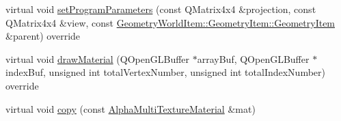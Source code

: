 \begin{DoxyCompactItemize}
virtual void \mbox{\hyperlink{class_geometry_engine_1_1_geometry_material_1_1_alpha_multi_texture_material_ad230fe9a3f174933644c40ed10ba15a7}{set\+Program\+Parameters}} (const Q\+Matrix4x4 \&projection, const Q\+Matrix4x4 \&view, const \mbox{\hyperlink{class_geometry_engine_1_1_geometry_world_item_1_1_geometry_item_1_1_geometry_item}{Geometry\+World\+Item\+::\+Geometry\+Item\+::\+Geometry\+Item}} \&parent) override
\item 
virtual void \mbox{\hyperlink{class_geometry_engine_1_1_geometry_material_1_1_alpha_multi_texture_material_a1ccf4b07be9fe240d521345eb5312a79}{draw\+Material}} (Q\+Open\+G\+L\+Buffer $\ast$array\+Buf, Q\+Open\+G\+L\+Buffer $\ast$index\+Buf, unsigned int total\+Vertex\+Number, unsigned int total\+Index\+Number) override
\item 
virtual void \mbox{\hyperlink{class_geometry_engine_1_1_geometry_material_1_1_alpha_multi_texture_material_a98e22afaa7a3b015815d00dbc4daf9ce}{copy}} (const \mbox{\hyperlink{class_geometry_engine_1_1_geometry_material_1_1_alpha_multi_texture_material}{Alpha\+Multi\+Texture\+Material}} \&mat)
\end{DoxyCompactItemize}
